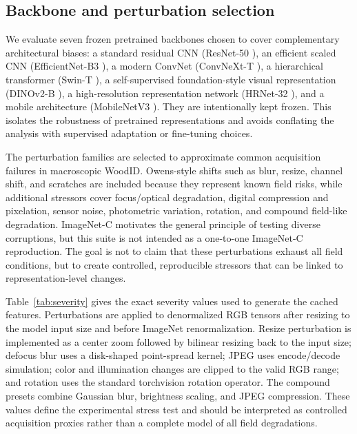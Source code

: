 \documentclass[a4paper,fleqn]{els-cas-templates/cas-sc}
\begin{document}
\subsection{Backbone and perturbation selection}

We evaluate seven frozen pretrained backbones chosen to cover complementary architectural biases: a standard residual CNN (ResNet-50 \citep{he2016resnet}), an efficient scaled CNN (EfficientNet-B3 \citep{tan2019efficientnet}), a modern ConvNet (ConvNeXt-T \citep{liu2022convnext}), a hierarchical transformer (Swin-T \citep{liu2021swin}), a self-supervised foundation-style visual representation (DINOv2-B \citep{oquab2023dinov2}), a high-resolution representation network (HRNet-32 \citep{sun2019hrnet}), and a mobile architecture (MobileNetV3 \citep{howard2019mobilenetv3}). They are intentionally kept frozen. This isolates the robustness of pretrained representations and avoids conflating the analysis with supervised adaptation or fine-tuning choices.

The perturbation families are selected to approximate common acquisition failures in macroscopic WoodID. Owens-style shifts such as blur, resize, channel shift, and scratches are included because they represent known field risks, while additional stressors cover focus/optical degradation, digital compression and pixelation, sensor noise, photometric variation, rotation, and compound field-like degradation. ImageNet-C motivates the general principle of testing diverse corruptions, but this suite is not intended as a one-to-one ImageNet-C reproduction. The goal is not to claim that these perturbations exhaust all field conditions, but to create controlled, reproducible stressors that can be linked to representation-level changes.

Table~\ref{tab:severity} gives the exact severity values used to generate the cached features. Perturbations are applied to denormalized RGB tensors after resizing to the model input size and before ImageNet renormalization. Resize perturbation is implemented as a center zoom followed by bilinear resizing back to the input size; defocus blur uses a disk-shaped point-spread kernel; JPEG uses encode/decode simulation; color and illumination changes are clipped to the valid RGB range; and rotation uses the standard torchvision rotation operator. The compound presets combine Gaussian blur, brightness scaling, and JPEG compression. These values define the experimental stress test and should be interpreted as controlled acquisition proxies rather than a complete model of all field degradations.
\end{document}
